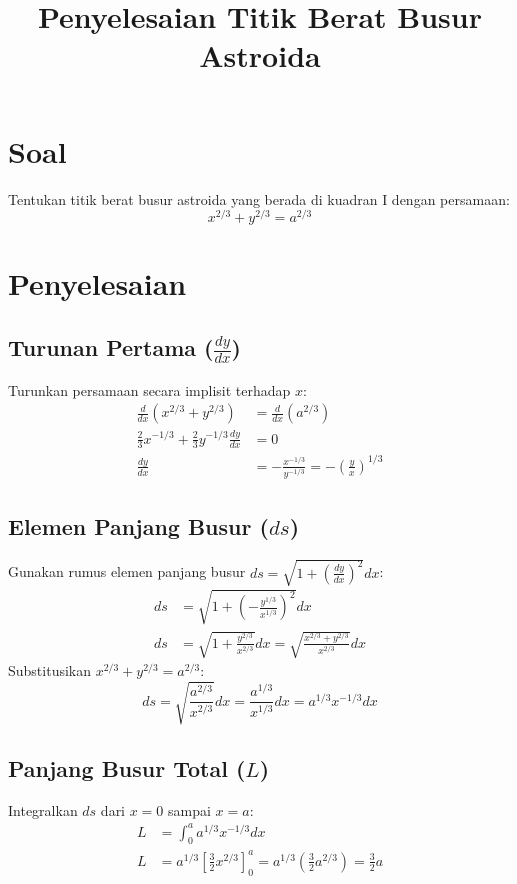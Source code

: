 \documentclass[12pt,a4paper]{article}
\title{Penyelesaian Titik Berat Busur Astroida}
\author{}
\date{}
\begin{document}
\maketitle

\section{Soal}
Tentukan titik berat busur astroida yang berada di kuadran I dengan persamaan:
\begin{equation}
  x^{2/3} + y^{2/3} = a^{2/3}
\end{equation}

\section{Penyelesaian}

\subsection{Turunan Pertama ($\frac{dy}{dx}$)}
Turunkan persamaan secara implisit terhadap $x$:
\begin{align*}
  \frac{d}{dx}(x^{2/3} + y^{2/3}) &= \frac{d}{dx}(a^{2/3}) \\
  \frac{2}{3}x^{-1/3} + \frac{2}{3}y^{-1/3} \frac{dy}{dx} &= 0 \\
  \frac{dy}{dx} &= -\frac{x^{-1/3}}{y^{-1/3}} = -\left( \frac{y}{x} \right)^{1/3}
\end{align*}

\subsection{Elemen Panjang Busur ($ds$)}
Gunakan rumus elemen panjang busur $ds = \sqrt{1 + \left(\frac{dy}{dx}\right)^2} dx$:
\begin{align*}
  ds &= \sqrt{1 + \left( -\frac{y^{1/3}}{x^{1/3}} \right)^2} dx \\
  ds &= \sqrt{1 + \frac{y^{2/3}}{x^{2/3}}} dx = \sqrt{\frac{x^{2/3} + y^{2/3}}{x^{2/3}}} dx
\end{align*}
Substitusikan $x^{2/3} + y^{2/3} = a^{2/3}$:
\begin{equation}
  ds = \sqrt{\frac{a^{2/3}}{x^{2/3}}} dx = \frac{a^{1/3}}{x^{1/3}} dx = a^{1/3} x^{-1/3} dx
\end{equation}

\subsection{Panjang Busur Total ($L$)}
Integralkan $ds$ dari $x = 0$ sampai $x = a$:
\begin{align*}
  L &= \int_{0}^{a} a^{1/3} x^{-1/3} dx \\
  L &= a^{1/3} \left[ \frac{3}{2} x^{2/3} \right]_0^a = a^{1/3} \left( \frac{3}{2} a^{2/3} \right) = \frac{3}{2}a
\end{align*}
\end{document}
